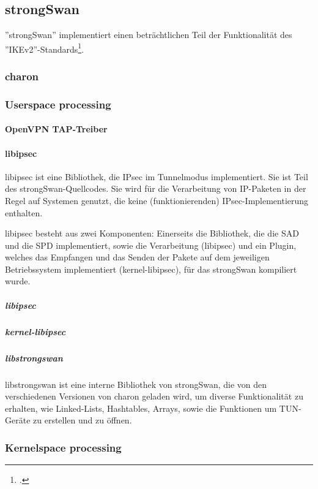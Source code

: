 \subsection{strongSwan}
''strongSwan'' implementiert einen beträchtlichen Teil der Funktionalität des ''IKEv2''-Standards\footcite{charlie_kaufman_rfc_2014}.
\subsubsection{charon}
\subsubsection{Userspace processing}
\paragraph{OpenVPN TAP-Treiber}
\paragraph{libipsec}
libipsec ist eine Bibliothek, die IPsec im Tunnelmodus implementiert.
Sie ist Teil des strongSwan-Quellcodes. Sie wird für die Verarbeitung von IP-Paketen
in der Regel auf Systemen genutzt, die keine (funktionierenden) IPsec-Implementierung
enthalten.

libipsec besteht aus zwei Komponenten: Einerseits die Bibliothek, die die SAD und die SPD
implementiert, sowie die Verarbeitung (libipsec) und ein Plugin, welches das Empfangen und das Senden
der Pakete auf dem jeweiligen Betriebssystem implementiert (kernel-libipsec), für das strongSwan kompiliert wurde.

\subparagraph{libipsec}
\subparagraph{kernel-libipsec}
\subparagraph{libstrongswan}
libstrongswan ist eine interne Bibliothek von strongSwan, die von den verschiedenen
Versionen von charon geladen wird, um diverse Funktionalität zu erhalten, wie
Linked-Lists, Hashtables, Arrays, sowie die Funktionen um TUN-Geräte zu erstellen und zu öffnen.

\subsubsection{Kernelspace processing}

